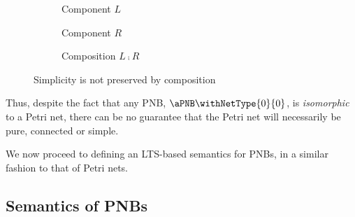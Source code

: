 \begin{figure}[ht]
    \centering
    \begin{subfigure}{0.33\textwidth}
    \centering
    \caption{Component $L$}
    \end{subfigure}%
    \begin{subfigure}{0.33\textwidth}
    \centering
    \caption{Component $R$}
    \end{subfigure}
    \begin{subfigure}{0.33\textwidth}
    \centering
    \caption{Composition $L \comp R$}
    \end{subfigure}
    \caption{Simplicity is not preserved by composition}
    \label{fig:simpleComponents}
\end{figure}

Thus, despite the fact that any PNB, $\aPNB \withNetType{0}{0}$, is
\emph{isomorphic} to a Petri net, there can be no guarantee that the Petri net
will necessarily be pure, connected or simple.

We now proceed to defining an LTS-based semantics for PNBs, in a similar
fashion to that of Petri nets.

\subsection{\TLTS{} Semantics of PNBs} \label{sec:ltsPNB}

